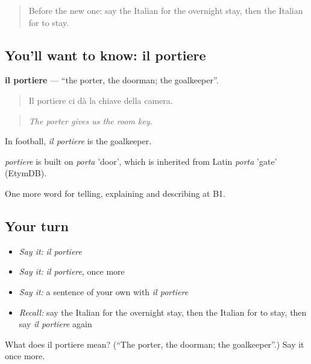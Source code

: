 \label{lesson:IT-C432-portiere}



\begin{quote}
Before the new one: say the Italian for the overnight stay, then the Italian for to stay.
\end{quote}

\subsection*{You'll want to know: il portiere}
\textbf{il portiere} — \textquotedblleft{}the porter, the doorman; the goalkeeper\textquotedblright{}.

\begin{quote}
Il portiere ci dà la chiave della camera.
\end{quote}

\begin{quote}
\emph{The porter gives us the room key.}
\end{quote}

In football, \emph{il portiere} is the goalkeeper.

\begin{cousinweb}
\emph{portiere} is built on \emph{porta} 'door', which is inherited from Latin \emph{porta} 'gate' (EtymDB).
\end{cousinweb}

\begin{grammarlens}[title={What you've built}]
One more word for telling, explaining and describing at B1.
\end{grammarlens}

\subsection*{Your turn}
\begin{itemize}
\raggedright
  \item \emph{Say it:} \emph{il portiere}
  \item \emph{Say it:} \emph{il portiere}, once more
  \item \emph{Say it:} a sentence of your own with \emph{il portiere}
  \item \emph{Recall:} say the Italian for the overnight stay, then the Italian for to stay, then say \emph{il portiere} again
\end{itemize}

\begin{tcolorbox}[breakable,colback=teal!4,colframe=teal!35!black,title={Before you move on}]
What does il portiere mean? (\textquotedblleft{}The porter, the doorman; the goalkeeper\textquotedblright{}.) Say it once more.
\end{tcolorbox}
